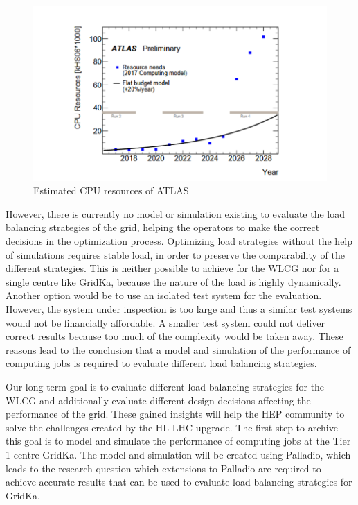 \begin{figure}
	\centering
	\includegraphics[width=1.0\linewidth]{images/resources}
	\caption[]{Estimated CPU resources of ATLAS \cite{community}}
	\label{resources}
\end{figure}



However, there is currently no model or simulation existing to evaluate the load balancing strategies of the grid, helping the operators to make the correct decisions in the optimization process.
Optimizing load strategies without the help of simulations requires stable load, in order to preserve the comparability of the different strategies. This is neither possible to achieve for the WLCG nor for a single centre like GridKa, because the nature of the load is highly dynamically. Another option would be to use an isolated test system for the evaluation. However, the system under inspection is too large and thus a similar test systems would not be financially affordable. A smaller test system could not deliver correct results because too much of the complexity would be taken away.
These reasons lead to the conclusion that a model and simulation of the performance of computing jobs is required to evaluate different load balancing strategies.

Our long term goal is to evaluate different load balancing strategies for the WLCG and additionally evaluate different design decisions affecting the performance of the grid. These gained insights will help the HEP community to solve the challenges created by the HL-LHC upgrade.
The first step to archive this goal is to model and simulate the performance of computing jobs at the Tier 1 centre GridKa.
The model and simulation will be created using Palladio, which leads to the research question which extensions to Palladio are required to achieve accurate results that can be used to evaluate load balancing strategies for GridKa.

